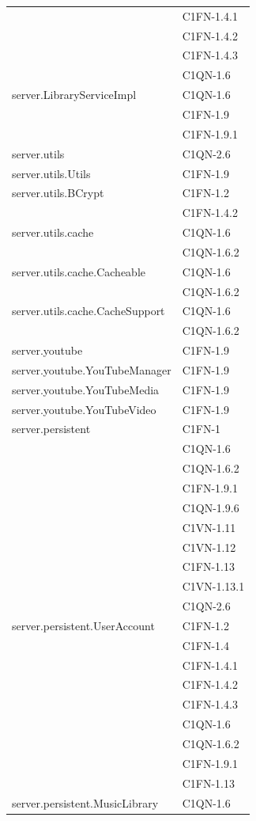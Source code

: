 \begin{footnotesize}
\begin{longtable}[!h]{|l|l|}
& C1FN-1.4.1\\
& C1FN-1.4.2\\
& C1FN-1.4.3\\
& C1QN-1.6\\\hline 
server.LibraryServiceImpl  &  C1QN-1.6 \\
& C1FN-1.9\\
& C1FN-1.9.1\\\hline 
server.utils  &  C1QN-2.6 \\\hline  
server.utils.Utils  & C1FN-1.9\\\hline
server.utils.BCrypt  &  C1FN-1.2 \\
& C1FN-1.4.2\\\hline
server.utils.cache & C1QN-1.6\\
& C1QN-1.6.2\\\hline
server.utils.cache.Cacheable & C1QN-1.6\\
& C1QN-1.6.2\\\hline
server.utils.cache.CacheSupport & C1QN-1.6\\
& C1QN-1.6.2\\\hline
server.youtube  &  C1FN-1.9\\\hline
server.youtube.YouTubeManager  &  C1FN-1.9 \\\hline
server.youtube.YouTubeMedia  &  C1FN-1.9 \\\hline
server.youtube.YouTubeVideo  &  C1FN-1.9 \\\hline
server.persistent  &  C1FN-1 \\
& C1QN-1.6\\
& C1QN-1.6.2\\
& C1FN-1.9.1\\
& C1QN-1.9.6\\
& C1VN-1.11\\
& C1VN-1.12\\
& C1FN-1.13\\
& C1VN-1.13.1\\
& C1QN-2.6\\\hline 
server.persistent.UserAccount  &  C1FN-1.2\\
& C1FN-1.4\\
& C1FN-1.4.1\\
& C1FN-1.4.2\\
& C1FN-1.4.3\\
& C1QN-1.6\\
& C1QN-1.6.2\\ 
& C1FN-1.9.1\\
& C1FN-1.13\\\hline 
server.persistent.MusicLibrary  & C1QN-1.6\\

\end{longtable}
\end{footnotesize}
